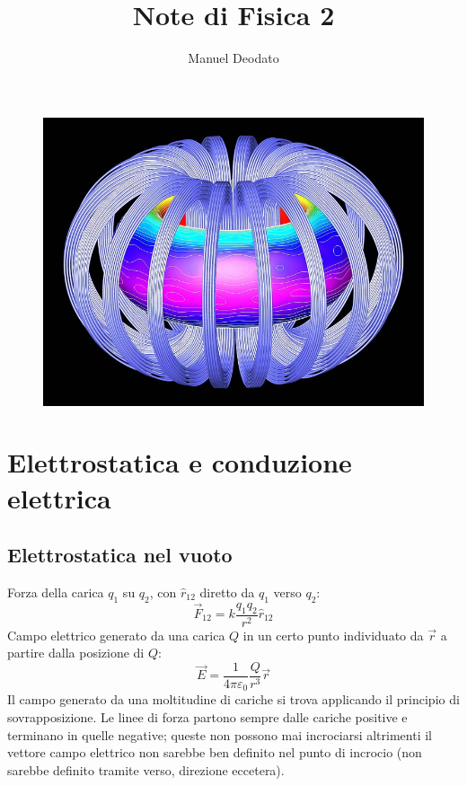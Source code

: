 \documentclass[10pt, a4paper]{scrartcl}
\title{Note di Fisica 2}
\author{Manuel Deodato}
\date{}
\renewcommand{\maketitle}{
\begin{center}
{\sffamily
{\fontsize{20}{20}\selectfont\MakeUppercase\thetitle}}

\vspace{0.2in}

{\large\scshape\sffamily\theauthor}
\end{center}
}
\numberwithin{equation}{subsection}
\theoremstyle{style1}
\begin{document}
\maketitle
\vspace{15em}
\begin{figure}[h!]
	\centering
	\includegraphics[width=1\columnwidth]{front.jpg}
\end{figure}
\newpage
\tableofcontents 
\newpage
\section{Elettrostatica e conduzione elettrica}
\subsection{Elettrostatica nel vuoto}


Forza della carica $q_1$ su $q_2$, con $\hat{r}_{12}$ diretto da $q_1$ verso $q_2$:
\begin{equation}
	\vec{F}_{12}  = k \frac{q_1q_2}{r^2}\hat{r}_{12} 
\end{equation}
Campo elettrico generato da una carica $Q$ in un certo punto individuato da $\vec{r}$ a partire dalla posizione di $Q$:
\begin{equation}
	\vec{E} = \frac{1}{4\pi \varepsilon_0} \frac{Q}{r^3}\vec{r}
\end{equation}
Il campo generato da una moltitudine di cariche si trova applicando il principio di sovrapposizione. Le linee di forza partono sempre dalle cariche positive e terminano in quelle negative; queste non possono mai incrociarsi altrimenti il vettore campo elettrico non sarebbe ben definito nel punto di incrocio (non sarebbe definito tramite verso, direzione eccetera).
\end{document}
